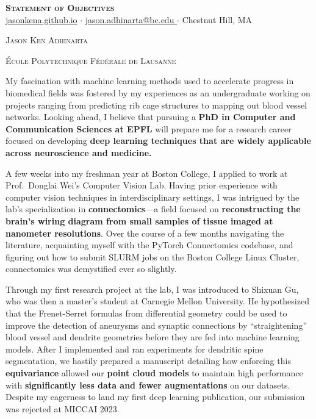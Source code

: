 \documentclass[letterpaper,11pt]{article}
\newcommand{\dualsectionold}[2]{%
  \noindent
    \parbox[b]{0.5\textwidth}{\raggedright\scshape\large #1}%
    \hfill
    \parbox[b]{0.5\textwidth}{\raggedleft\scshape\large #2}%
}
\newcommand{\dualsectionhline}{%
  \vspace{2pt}\color{black}\titlerule\vspace{-5pt}
}
\newcommand{\dualsection}[2]{%
  \dualsectionold{#1}{#2}%
  \vspace{-5pt}\dualsectionhline
}
\begin{document}
\justifying

\begin{center}
  \textbf{\Huge \scshape Statement of Objectives} \\ \vspace{3pt}
    \small
    \href{https://jasonkena.github.io}{jasonkena.github.io}
   \hspace{0.05cm}$\cdot$\hspace{0.05cm}
    \href{mailto:jason.adhinarta@bc.edu}{ jason.adhinarta@bc.edu }
   \hspace{0.05cm}$\cdot$\hspace{0.05cm}
    Chestnut Hill, MA
\end{center}


\dualsection{Jason Ken Adhinarta}{École Polytechnique Fédérale de Lausanne}
\vspace{2pt}\color{black}\titlerule%

My fascination with machine learning methods used to accelerate progress in biomedical fields was fostered by my experiences as an undergraduate working on projects ranging from predicting rib cage structures to mapping out blood vessel networks. Looking ahead, I believe that pursuing a \textbf{PhD in Computer and Communication Sciences at EPFL} will prepare me for a research career focused on developing \textbf{deep learning techniques that are widely applicable across neuroscience and medicine.}

A few weeks into my freshman year at Boston College, I applied to work at Prof.\ Donglai Wei’s Computer Vision Lab. Having prior experience with computer vision techniques in interdisciplinary settings, I was intrigued by the lab’s specialization in \textbf{connectomics}---a field focused on \textbf{reconstructing the brain’s wiring diagram from small samples of tissue imaged at nanometer resolutions}. Over the course of a few months navigating the literature, acquainting myself with the PyTorch Connectomics codebase, and figuring out how to submit SLURM jobs on the Boston College Linux Cluster, connectomics was demystified ever so slightly.

Through my first research project at the lab, I was introduced to Shixuan Gu, who was then a master’s student at Carnegie Mellon University. He hypothesized that the Frenet-Serret formulas from differential geometry could be used to improve the detection of aneurysms and synaptic connections by “straightening” blood vessel and dendrite geometries before they are fed into machine learning models. After I implemented and ran experiments for dendritic spine segmentation, we hastily prepared a manuscript detailing how enforcing this \textbf{equivariance} allowed our \textbf{point cloud models} to maintain high performance with \textbf{significantly less data and fewer augmentations} on our datasets. Despite my eagerness to land my first deep learning publication, our submission was rejected at MICCAI 2023.
\end{document}
